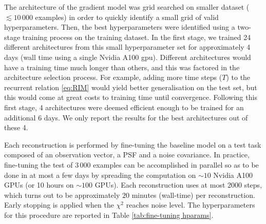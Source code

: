 The architecture of the gradient model was grid searched on 
smaller dataset ($\lesssim 10\,000$ examples) 
in order to quickly identify a small grid 
of valid hyperparameters. Then, the best hyperparameters were 
identified using a two-stage training process on the training dataset. 
In the first stage, we trained 24 different architectures from this small 
hyperparameter set for approximately 4 days (wall time using a single Nvidia A100 gpu). 
Different architectures would have a training time much longer than others, and this 
was factored in the architecture selection process. For example, adding more time 
steps ($T$) to the recurrent relation \eqref{eq:RIM} 
would yield better generalisation on the test set, but this 
would come at great costs to training time until convergence. 
Following this first stage, 4 architectures were deemed efficient enough 
to be trained for an additional 6 days. 
We only report the results for the best architectures out of these 4.

Each reconstruction is performed by fine-tuning the baseline model 
on a test task composed of an observation vector, a PSF and a noise covariance.
In practice, fine-tuning the test of $3\,000$ examples can be accomplished in parallel so as to be done in at most a few days by spreading the computation on $\sim 10$ Nvidia A100 GPUs (or 10 hours on $\sim 100$ GPUs). Each reconstruction uses at most 2000 steps, which turns out to be approximately $20$ minutes (wall-time) per reconstruction. Early stopping is applied when the $\chi^2$ reaches noise level. The hyperparameters for this procedure are reported in Table \ref{tab:fine-tuning hparams}.

